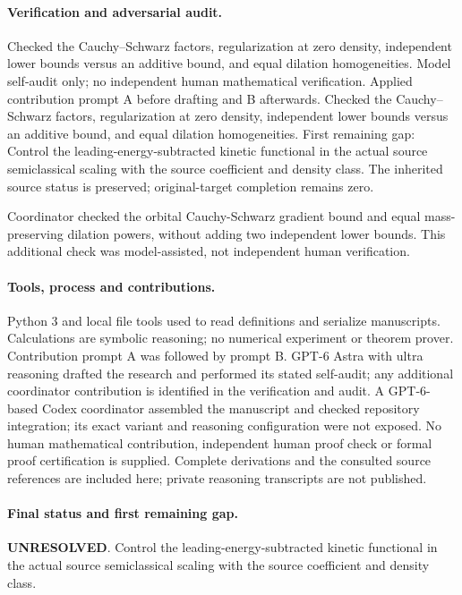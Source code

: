 \documentclass[11pt]{article}
\begin{document}
\paragraph{Verification and adversarial audit.}
Checked the Cauchy--Schwarz factors, regularization at zero density, independent lower bounds versus an additive bound, and equal dilation homogeneities. Model self-audit only; no independent human mathematical verification. Applied contribution prompt A before drafting and B afterwards. Checked the Cauchy--Schwarz factors, regularization at zero density, independent lower bounds versus an additive bound, and equal dilation homogeneities. First remaining gap: Control the leading-energy-subtracted kinetic functional in the actual source semiclassical scaling with the source coefficient and density class. The inherited source status is preserved; original-target completion remains zero.

Coordinator checked the orbital Cauchy-Schwarz gradient bound and equal mass-preserving dilation powers, without adding two independent lower bounds. This additional check was model-assisted, not independent human verification.

\paragraph{Tools, process and contributions.}
Python 3 and local file tools used to read definitions and serialize manuscripts. Calculations are symbolic reasoning; no numerical experiment or theorem prover. Contribution prompt A was followed by prompt B. GPT-6 Astra with ultra reasoning drafted the research and performed its stated self-audit; any additional coordinator contribution is identified in the verification and audit. A GPT-6-based Codex coordinator assembled the manuscript and checked repository integration; its exact variant and reasoning configuration were not exposed. No human mathematical contribution, independent human proof check or formal proof certification is supplied. Complete derivations and the consulted source references are included here; private reasoning transcripts are not published.

\paragraph{Final status and first remaining gap.}
\textbf{UNRESOLVED}. Control the leading-energy-subtracted kinetic functional in the actual source semiclassical scaling with the source coefficient and density class.
\end{document}
